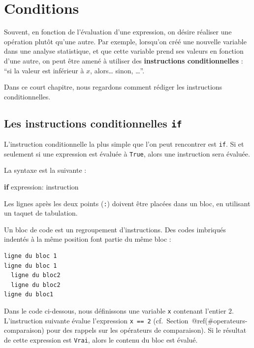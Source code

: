 \documentclass[12pt,]{book}
\newenvironment{Shaded}{\begin{snugshade}}{\end{snugshade}}
\newcommand{\ControlFlowTok}[1]{\textcolor[rgb]{0.13,0.29,0.53}{\textbf{#1}}}
\newcommand{\NormalTok}[1]{#1}
\numberwithin{equation}{section}
\numberwithin{countremarque}{section}
\let\BeginKnitrBlock\begin \let\EndKnitrBlock\end
\begin{document}
\chapter{Conditions}\label{conditions}

Souvent, en fonction de l'évaluation d'une expression, on désire
réaliser une opération plutôt qu'une autre. Par exemple, lorsqu'on créé
une nouvelle variable dans une analyse statistique, et que cette
variable prend ses valeurs en fonction d'une autre, on peut être amené à
utiliser des \textbf{instructions conditionnelles} : ``si la valeur est
inférieur à \(x\), alors\ldots{} sinon, \ldots{}''.

Dans ce court chapitre, nous regardons comment rédiger les instructions
conditionnelles.

\section{\texorpdfstring{Les instructions conditionnelles
\texttt{if}}{Les instructions conditionnelles if}}\label{les-instructions-conditionnelles-if}

L'instruction conditionnelle la plus simple que l'on peut rencontrer est
\texttt{if}. Si et seulement si une expression est évaluée à
\texttt{True}, alors une instruction sera évaluée.

La syntaxe est la suivante :

\begin{Shaded}
\begin{Highlighting}[]
\ControlFlowTok{if}\NormalTok{ expression:}
\NormalTok{  instruction}
\end{Highlighting}
\end{Shaded}

Les lignes après les deux points (\texttt{:}) doivent être placées dans
un bloc, en utilisant un taquet de tabulation.

\BeginKnitrBlock{remarque}
Un bloc de code est un regroupement d'instructions. Des codes imbriqués
indentés à la même position font partie du même bloc :

\begin{lstlisting}
ligne du bloc 1
ligne du bloc 1
  ligne du bloc2
  ligne du bloc2
ligne du bloc1
\end{lstlisting}
\EndKnitrBlock{remarque}

Dans le code ci-dessous, nous définissons une variable \texttt{x}
contenant l'entier \(2\). L'instruction suivante évalue l'expression
\texttt{x\ ==\ 2} (cf.~Section~@ref(\#operateurs-comparaison) pour des
rappels sur les opérateurs de comparaison). Si le résultat de cette
expression est \texttt{Vrai}, alors le contenu du bloc est évalué.
\end{document}
